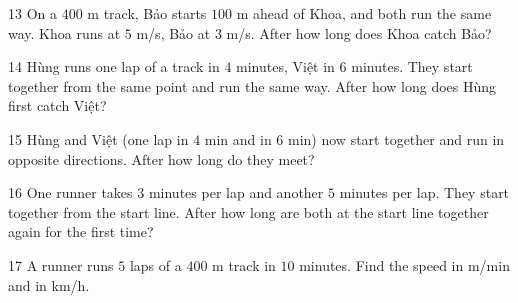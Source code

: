 \gap
\begin{probbox}{13}{\relax}
On a $400$ m track, Bảo starts $100$ m ahead of Khoa, and both run the same way. Khoa runs at $5$ m/s, Bảo at $3$ m/s. After how long does Khoa catch Bảo?
\end{probbox}
\gap
\begin{probbox}{14}{\relax}
Hùng runs one lap of a track in $4$ minutes, Việt in $6$ minutes. They start together from the same point and run the same way. After how long does Hùng first catch Việt?
\end{probbox}
\gap
\begin{probbox}{15}{\relax}
Hùng and Việt (one lap in $4$ min and in $6$ min) now start together and run in opposite directions. After how long do they meet?
\end{probbox}
\gap
\begin{probbox}{16}{\relax}
One runner takes $3$ minutes per lap and another $5$ minutes per lap. They start together from the start line. After how long are both at the start line together again for the first time?
\end{probbox}
\gap
\begin{probbox}{17}{\relax}
A runner runs $5$ laps of a $400$ m track in $10$ minutes. Find the speed in m/min and in km/h.
\end{probbox}
